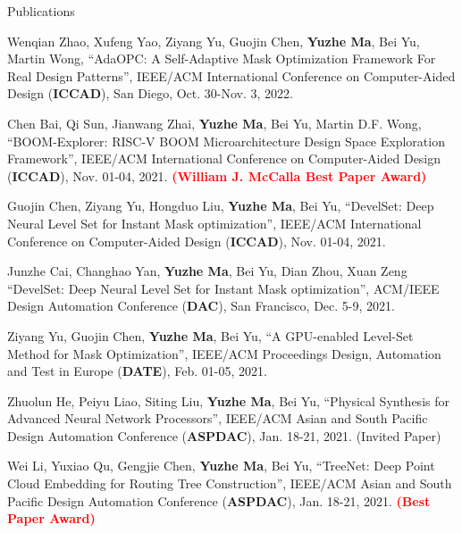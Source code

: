 \begin{rSection}{Publications}
\begin{description}[font=\normalfont]
\item [{[C26]}]{
    Wenqian Zhao, Xufeng Yao, Ziyang Yu, Guojin Chen, \textbf{Yuzhe Ma}, Bei Yu, Martin Wong,
    ``AdaOPC: A Self-Adaptive Mask Optimization Framework For Real Design Patterns'',
    IEEE/ACM International Conference on Computer-Aided Design (\textbf{ICCAD}), San Diego, Oct. 30-Nov. 3, 2022.
}

\item [{[C25]}]{
    Chen Bai, Qi Sun, Jianwang Zhai, \textbf{Yuzhe Ma}, Bei Yu, Martin D.F. Wong,
    ``BOOM-Explorer: RISC-V BOOM Microarchitecture Design Space Exploration Framework'',
    IEEE/ACM International Conference on Computer-Aided Design (\textbf{ICCAD}), Nov. 01-04, 2021.
    \textcolor{red}{\textbf{(William J. McCalla Best Paper Award)}}
}


\item [{[C24]}]{
    Guojin Chen, Ziyang Yu, Hongduo Liu, \textbf{Yuzhe Ma}, Bei Yu,
    ``DevelSet: Deep Neural Level Set for Instant Mask optimization'',
    IEEE/ACM International Conference on Computer-Aided Design (\textbf{ICCAD}), Nov. 01-04, 2021.
}

\item [{[C23]}]{
    Junzhe Cai, Changhao Yan, \textbf{Yuzhe Ma}, Bei Yu, Dian Zhou, Xuan Zeng
    ``DevelSet: Deep Neural Level Set for Instant Mask optimization'',
    ACM/IEEE Design Automation Conference (\textbf{DAC}), San Francisco, Dec. 5-9, 2021. 
}

\item [{[C22]}]{
        Ziyang Yu, Guojin Chen, \textbf{Yuzhe Ma}, Bei Yu,
        ``A GPU-enabled Level-Set Method for Mask Optimization'',
        IEEE/ACM Proceedings Design, Automation and Test in Europe (\textbf{DATE}), Feb. 01-05, 2021.
    }

\item [{[C21]}]{
        Zhuolun He, Peiyu Liao, Siting Liu, \textbf{Yuzhe Ma}, Bei Yu,
        ``Physical Synthesis for Advanced Neural Network Processors'',
         IEEE/ACM Asian and South Pacific Design Automation Conference (\textbf{ASPDAC}), Jan. 18-21, 2021. (Invited Paper)
    }

\item [{[C20]}]{
        Wei Li, Yuxiao Qu, Gengjie Chen, \textbf{Yuzhe Ma}, Bei Yu,
        ``TreeNet: Deep Point Cloud Embedding for Routing Tree Construction'',
         IEEE/ACM Asian and South Pacific Design Automation Conference (\textbf{ASPDAC}), Jan. 18-21, 2021.
        \textcolor{red}{\textbf{(Best Paper Award)}}
    }


\end{description}
\end{rSection}
